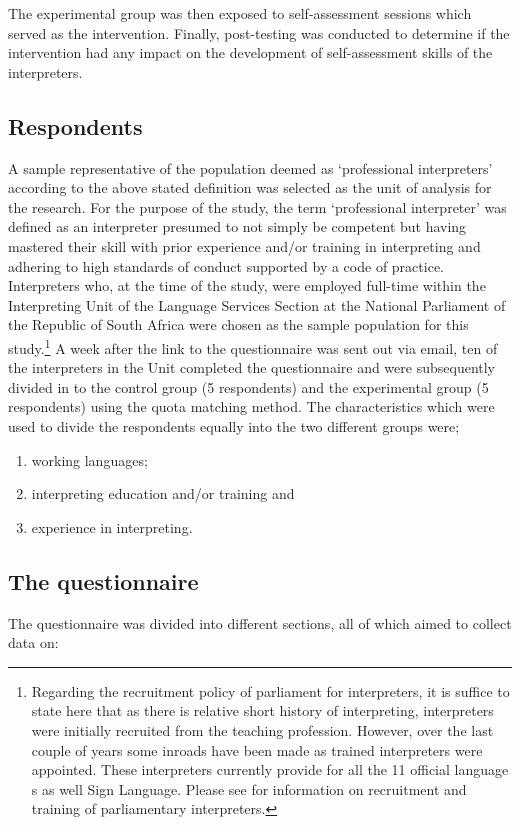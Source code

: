 \documentclass[output=paper]{langsci/langscibook}
\begin{document}
The experimental group was then exposed to self-assessment sessions which served as the intervention. Finally, post-testing was conducted to determine if the intervention had any impact on the development of self-assessment skills of the interpreters.

\subsection{Respondents}
A sample representative of the population deemed as ‘professional interpreters’ according to the above stated definition was selected as the unit of analysis for the research. For the purpose of the study, the term ‘professional interpreter’ was defined as an interpreter presumed to not simply be competent but having mastered their skill with prior experience and/or training in interpreting and adhering to high standards of conduct supported by a code of practice. Interpreters who, at the time of the study, were employed full-time within the Interpreting Unit of the Language Services Section at the National Parliament of the Republic of South Africa were chosen as the sample population for this study.\footnote{Regarding the recruitment policy of parliament for interpreters, it is suffice to state here that as there is relative short history of interpreting, interpreters were initially recruited from the teaching profession. However, over the last couple of years some inroads have been made as trained interpreters were appointed. These interpreters currently provide for all the 11 official language s as well Sign Language.  Please see \citet{Lesch2010} for information on recruitment and training of parliamentary interpreters.} A week after the link to the questionnaire was sent out via email, ten of the interpreters in the Unit completed the questionnaire and were subsequently divided in to the control group (5 respondents) and the experimental group (5 respondents) using the quota matching method.  The characteristics which were used to divide the respondents equally into the two different groups were; 

\begin{enumerate}
\item working languages; 
\item interpreting education and/or training and 
\item experience in interpreting.
\end{enumerate}

\subsection{The questionnaire}
The questionnaire was divided into different sections, all of which aimed to collect data on:
\end{document}

